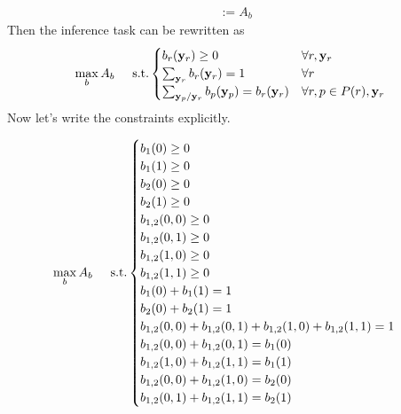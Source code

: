 {\begin{align*}
	& := A_b
\end{align*}
Then the inference task can be rewritten as  
\begin{align*}
\max_{b} A_b \hspace{0.5cm} \text{s.t.} 
\begin{cases}
	b_r(\mathbf{y}_r) \ge 0 &\forall r, \mathbf{y}_r \\
	\sum_{\mathbf{y}_r} b_r(\mathbf{y}_r) = 1 &\forall r\\
	\sum_{\mathbf{y}_p / \mathbf{y}_r}  b_p(\mathbf{y}_p) = b_r(\mathbf{y}_r) &\forall r, p \in P(r), \mathbf{y}_r
\end{cases}
\end{align*}
Now let's  write the constraints explicitly. 

\begin{align*}
\max_{b} A_b \hspace{0.5cm} \text{s.t.} 
\begin{cases}
	b_1(0) \ge 0\\
	b_1(1) \ge 0\\
	b_2(0) \ge 0\\
	b_2(1) \ge 0\\
	b_{1,2}(0, 0) \ge 0\\
	b_{1,2}(0, 1) \ge 0\\
	b_{1,2}(1, 0) \ge 0\\
	b_{1,2}(1, 1) \ge 0\\
	b_1(0) + b_1(1) = 1\\
	b_2(0) + b_2(1) = 1\\
	b_{1,2}(0, 0) + b_{1,2}(0, 1) + b_{1,2}(1, 0) + b_{1,2}(1, 1) = 1\\
	b_{1, 2}(0, 0) + b_{1, 2}(0, 1) = b_1(0)\\
	b_{1, 2}(1, 0) + b_{1, 2}(1, 1) = b_1(1)\\
	b_{1, 2}(0, 0) + b_{1, 2}(1, 0) = b_2(0)\\
	b_{1, 2}(0, 1) + b_{1, 2}(1, 1) = b_2(1)
\end{cases}
\end{align*}
}

\newcommand{\MRFStudSolBB}{
Note that the new cost function is 
\[ b_1(0) + 2b_1(1) + b_2(0) + 2b_2(1) - b_{1, 2}(0, 0) + 2b_{1, 2}(0, 1) - b_{1, 2}(1, 0) - b_{1, 2}(1, 1) \]
By simply looking at the previous item we can see that the maximum value is achieved when letting $b_{1, 2}(0, 1) = 1$. Then the solution is
The solution is:
\begin{align*}
b_1(0) &= 1\\
b_1(1) &= 0\\
b_2(0) &= 0\\
b_2(1) &= 1\\
b_{1, 2}(0, 0) &= 0\\
b_{1, 2}(0, 1) &= 1\\
b_{1, 2}(1, 0) &= 0\\
b_{1, 2}(1, 1) &= 0
\end{align*}
And then the value of our cost function is:
\[1 + 2(0) + 0 + 2(1) - 0 + 2(1) - 0 - 0 = 1 + 2 + 2 = 5\]
}

